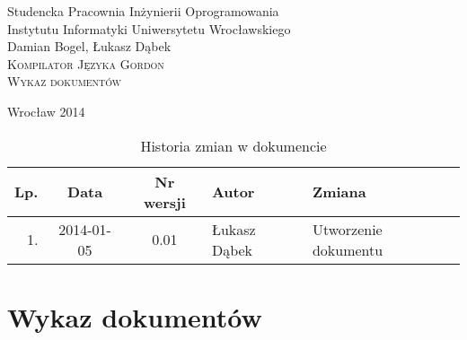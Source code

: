 \documentclass{documentation}
\begin{document}
\begin{titlepage}
\begin{center}
Studencka Pracownia Inżynierii Oprogramowania\\
Instytutu Informatyki Uniwersytetu Wrocławskiego\\[6cm]

Damian Bogel, Łukasz Dąbek\\[1cm]
\textsc{\LARGE Kompilator Języka Gordon}\\[0.5cm]
\textsc{\large Wykaz dokumentów}

\vfill
Wrocław 2014 \\[2.5cm]

\end{center}
\end{titlepage}

\newpage
\begin{table}
	\centering
    \captionsetup{name=Tabela,labelsep=period}
	\caption{Historia zmian w dokumencie}
		\begin{tabular}{|r|c|c|l|l|}
		\hline
		Lp.  & Data       & Nr wersji & Autor                 & Zmiana \\ \hline
		1.   & 2014-01-05 & 0.01 & Łukasz Dąbek & Utworzenie dokumentu \\ \hline
	\end{tabular}
\end{table}
\newpage

\tableofcontents
\setcounter{page}{2}

\newpage

\section{Wykaz dokumentów}
\end{document}
